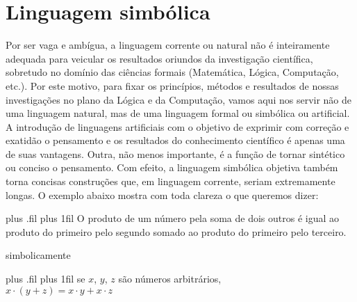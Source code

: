 \newpage

\section{Linguagem simbólica}
Por ser vaga e ambígua, a linguagem corrente ou natural não é inteiramente adequada para veicular os resultados oriundos da investigação científica, sobretudo no domínio das ciências formais (Matemática, Lógica, Computação, etc.).
Por este motivo, para fixar os princípios, métodos e resultados de nossas investigações no plano da Lógica e da Computação, vamos aqui nos servir não de uma linguagem natural, mas de uma linguagem formal ou simbólica ou artificial.
A introdução de linguagens artificiais com o objetivo de exprimir com correção e exatidão o pensamento e os resultados do conhecimento científico é apenas uma de suas vantagens.
Outra, não menos importante, é a função de tornar sintético ou conciso o pensamento.
Com efeito, a linguagem simbólica objetiva também torna concisas construções que, em linguagem corrente, seriam extremamente longas.
O exemplo abaixo mostra com toda clareza o que queremos dizer:

\vskip 1cm

\begin{center}
    \noindent\texttt{}
\end{center}
\vspace{-1\baselineskip} %

\begingroup

    \leftskip=3.3cm plus .fil \rightskip=3.3cm
    \parfillskip=0.5cm plus 1fil
    \noindent O produto de um número pela soma de dois outros é igual ao produto do primeiro pelo segundo somado ao produto do primeiro pelo terceiro.

    \vspace{-1\baselineskip} %
    \begin{center}
        \noindent\texttt{}
    \end{center}


    \centering simbolicamente

    \begin{center}
        \noindent\texttt{}
    \end{center}
    \vspace{-1\baselineskip} %

    \leftskip=3.6cm plus .fil \rightskip=3cm
    \parfillskip=0.5cm plus 1fil
    \noindent \centering se $x$, $y$, $z$ são números arbitrários,\\
    $x \cdot (y + z) = x \cdot y + x \cdot z$

